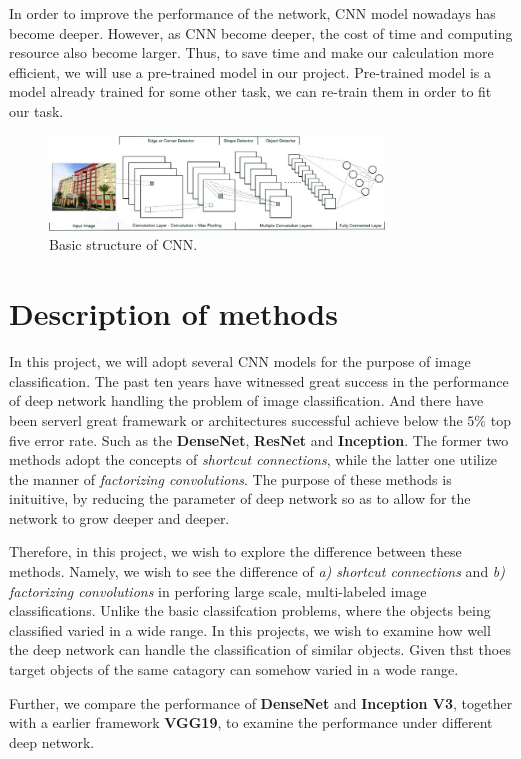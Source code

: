 \documentclass{article}
\begin{document}
In order to improve the performance of the network, CNN model nowadays has become deeper. However, as CNN become deeper, the cost of time and computing resource also become larger. Thus, to save time and make our calculation more efficient, we will use a pre-trained model in our project. Pre-trained model is a model already trained for some other task, we can re-train them in order to fit our task.

\begin{figure}[H]
	\centering
	\includegraphics[width=3.5in]{pics/CNN} 
	\caption{Basic structure of CNN.}
\end{figure}

\section{Description of methods}

In this project, we will adopt several CNN models for the purpose of image classification. 
The past ten years have witnessed great success in the performance of deep network handling the problem of image classification. 
And there have been serverl great framewark or architectures successful achieve below the $5\%$ top five error rate. 
Such as the \textbf{DenseNet}, \textbf{ResNet} and \textbf{Inception}. 
The former two methods adopt the concepts of \emph{shortcut connections}, while the latter one utilize the manner of \emph{factorizing convolutions}. 
The purpose of these methods is inituitive, by reducing the parameter of deep network so as to allow for the network to grow deeper and deeper. 

Therefore, in this project, we wish to explore the difference between these methods. 
Namely, we wish to see the difference of \emph{a) shortcut connections} and \emph{b) factorizing convolutions} in perforing large scale, multi-labeled image classifications.
Unlike the basic classifcation problems, where the objects being classified varied in a wide range.  
In this projects, we wish to examine how well the deep network can handle the classification of similar objects. Given thst thoes target objects of the same catagory can somehow varied in a wode range. 

Further, we compare the performance of \textbf{DenseNet} and \textbf{Inception V3}, together with a earlier framework \textbf{VGG19}, to examine the performance under different deep network.
\end{document}
